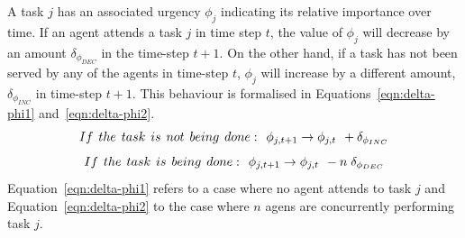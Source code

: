 \documentclass[smallcondensed]{svjour3}
\begin{document}
A task $j$ has an associated urgency $\phi_j$ indicating its relative importance over time.  If an agent attends a task $j$ in time step $t$, the value of $\phi_j$ will decrease by an amount $\delta_{\phi_{DEC}}$ in the time-step $t+1$.  On the other hand, if a task has not been served by any of the agents in time-step $t$, $\phi_j$ will increase by a different amount, $\delta_{\phi_{INC}}$ in time-step $t+1$.  This behaviour is formalised in Equations~\ref{eqn:delta-phi1} and~\ref{eqn:delta-phi2}.
\begin{equation}
 If\hspace*{0.15cm}the\hspace*{0.15cm} task\hspace*{0.15cm}is\hspace*{0.15cm}not\hspace*{0.15cm}being\hspace*{0.15cm} done:\hspace*{0.15cm} \phi_{j,t+1} \rightarrow \phi_{j,t} \hspace*{0.15cm} + \delta_{\phi_{INC}}
\label{eqn:delta-phi1}
\end{equation}
\begin{equation}
 If\hspace*{0.15cm}the \hspace*{0.15cm}task\hspace*{0.15cm}is\hspace*{0.15cm}being\hspace*{0.15cm}done:\hspace*{0.15cm}  \phi_{j,t+1} \rightarrow \phi_{j,t} \hspace*{0.15cm} - n\hspace*{0.10cm}\delta_{\phi_{DEC}}
\label{eqn:delta-phi2}
\end{equation}
Equation~\ref{eqn:delta-phi1} refers to a case where no agent attends to task $j$ and Equation~\ref{eqn:delta-phi2} to the case where $n$ agens are concurrently performing task $j$.
\end{document}
